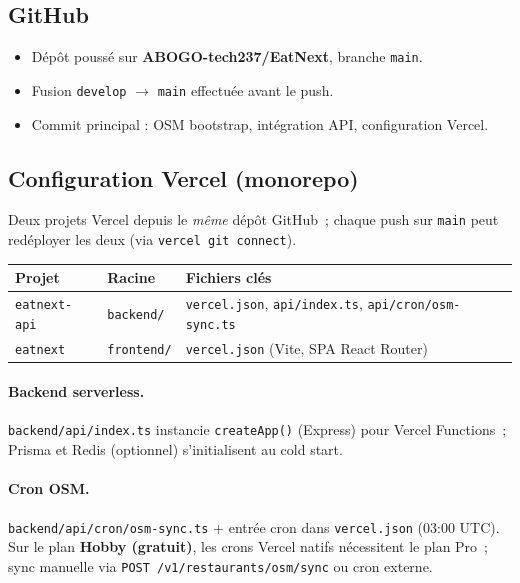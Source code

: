 \documentclass[11pt,a4paper]{article}
\begin{document}
\subsection{GitHub}

\begin{itemize}
  \item Dépôt poussé sur \textbf{ABOGO-tech237/EatNext}, branche \texttt{main}.
  \item Fusion \texttt{develop} $\rightarrow$ \texttt{main} effectuée avant le push.
  \item Commit principal : OSM bootstrap, intégration API, configuration Vercel.
\end{itemize}

\subsection{Configuration Vercel (monorepo)}

Deux projets Vercel depuis le \emph{même} dépôt GitHub~; chaque push sur \texttt{main}
peut redéployer les deux (via \texttt{vercel git connect}).

\begin{tabular}{@{}lll@{}}
\toprule
\textbf{Projet} & \textbf{Racine} & \textbf{Fichiers clés} \\
\midrule
\texttt{eatnext-api} & \texttt{backend/} &
  \texttt{vercel.json}, \texttt{api/index.ts}, \texttt{api/cron/osm-sync.ts} \\
\texttt{eatnext} & \texttt{frontend/} &
  \texttt{vercel.json} (Vite, SPA React Router) \\
\bottomrule
\end{tabular}

\paragraph{Backend serverless.}
\texttt{backend/api/index.ts} instancie \texttt{createApp()} (Express) pour Vercel
Functions~; Prisma et Redis (optionnel) s'initialisent au cold start.

\paragraph{Cron OSM.}
\texttt{backend/api/cron/osm-sync.ts} + entrée cron dans \texttt{vercel.json}
(03:00 UTC). Sur le plan \textbf{Hobby (gratuit)}, les crons Vercel natifs
nécessitent le plan Pro~; sync manuelle via
\texttt{POST /v1/restaurants/osm/sync} ou cron externe.
\end{document}
